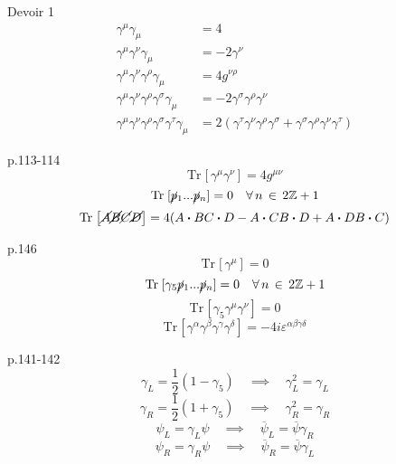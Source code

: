 \documentclass[12pt]{article}
\newcommand{\Z}{\mathbb{Z}}
\newcommand{\Tr}[1]{\mathrm{Tr}\hspace{1pt}\left[#1\right]}
\newcommand{\bdot}[0]{\boldsymbol{\cdot}}
\begin{document}
Devoir 1 \\
\begin{align}
  \gamma^\mu\gamma_\mu &= 4 \\
  \gamma^\mu\gamma^\nu\gamma_\mu &= -2\gamma^\nu \\
  \gamma^\mu\gamma^\nu\gamma^\rho\gamma_\mu &= 4g^{\nu\rho}\\
  \gamma^\mu\gamma^\nu\gamma^\rho\gamma^\sigma\gamma_\mu &= -2\gamma^\sigma\gamma^\rho\gamma^\nu\\
  \gamma^\mu\gamma^\nu\gamma^\rho\gamma^\sigma\gamma^\tau\gamma_\mu &= 2(\gamma^\tau\gamma^\nu\gamma^\rho\gamma^\sigma + \gamma^\sigma\gamma^\rho\gamma^\nu\gamma^\tau)
\end{align}

p.113-114 \\
\begin{equation}
  \Tr{\gamma^\mu\gamma^\nu} = 4g^{\mu\nu}
\end{equation}
\begin{equation}
  \Tr{\cancel{p}_1...\cancel{p}_n} = 0 \quad \forall\, n\, \in \, 2\Z+1
\end{equation}
\begin{equation}
  \Tr{\cancel{A}\cancel{B}\cancel{C}\cancel{D}} = 4(A\bdot B C \bdot D - A \bdot C B \bdot D + A \bdot D B \bdot C )
\end{equation}

p.146 \\
\begin{equation}
  \Tr{\gamma^\mu} = 0
\end{equation}
\begin{equation}
  \Tr{\gamma_5\cancel{p}_1...\cancel{p}_n} = 0 \quad \forall\, n\, \in \, 2\Z+1
\end{equation}
\begin{equation}
  \Tr{\gamma_5\gamma^\mu\gamma^\nu} = 0
\end{equation}
\begin{equation}
  \Tr{\gamma^\alpha\gamma^\beta\gamma^\gamma\gamma^\delta} = -4i\varepsilon^{\alpha\beta\gamma\delta}
\end{equation}

p.141-142
\begin{equation}
  \gamma_L = \frac{1}{2}(1-\gamma_5) \quad \implies \quad \gamma_L^2 = \gamma_L
\end{equation}
\begin{equation}
  \gamma_R = \frac{1}{2}(1+\gamma_5) \quad \implies \quad \gamma_R^2 = \gamma_R
\end{equation}
\begin{equation}
  \psi_L = \gamma_L\psi \quad \implies \quad \overline{\psi}_L = \overline{\psi}\gamma_R
\end{equation}
\begin{equation}
  \psi_R = \gamma_R\psi \quad \implies \quad \overline{\psi}_R = \overline{\psi}\gamma_L
\end{equation}
\end{document}
